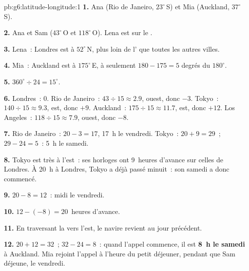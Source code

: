 \begin{solution}{pb:g6:latitude-longitude:1}
\textbf{1.} Ana (Rio de Janeiro, $23^\circ$\,S) et Mia (Auckland,
$37^\circ$\,S).

\textbf{2.} Ana et Sam ($43^\circ$\,O et $118^\circ$\,O). Lena est sur le
.

\textbf{3.} Lena~: Londres est à $52^\circ$\,N, plus loin de l' que
toutes les autres villes.

\textbf{4.} Mia~: Auckland est à $175^\circ$\,E, à seulement
$180 - 175 = 5$ degrés du  $180^\circ$.

\textbf{5.} $360^\circ \div 24 = 15^\circ$.

\textbf{6.} Londres~: $0$. Rio de Janeiro~: $43 \div 15 \approx 2.9$,
ouest, donc $-3$. Tokyo~: $140 \div 15 \approx 9.3$, est, donc $+9$.
Auckland~: $175 \div 15 \approx 11.7$, est, donc $+12$. Los Angeles~:
$118 \div 15 \approx 7.9$, ouest, donc $-8$.

\textbf{7.} Rio de Janeiro~: $20 - 3 = 17$, 17~h le vendredi. Tokyo~:
$20 + 9 = 29$~; $29 - 24 = 5$~: 5~h le samedi.

\textbf{8.} Tokyo est très à l'est~: ses horloges ont 9~heures d'avance
sur celles de Londres. À 20~h à Londres, Tokyo a déjà passé minuit~: son
samedi a donc commencé.

\textbf{9.} $20 - 8 = 12$~: midi le vendredi.

\textbf{10.} $12 - (-8) = 20$~heures d'avance.

\textbf{11.} En traversant la  vers l'est, le
navire revient au jour précédent.

\textbf{12.} $20 + 12 = 32$~; $32 - 24 = 8$~: quand l'appel commence, il
est \textbf{8~h le samedi} à Auckland. Mia rejoint l'appel à l'heure du
petit déjeuner, pendant que Sam déjeune, le vendredi.
\end{solution}
